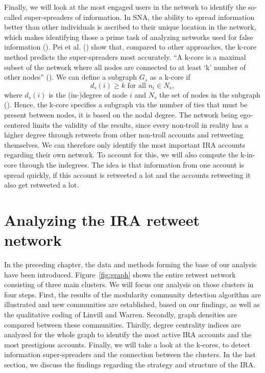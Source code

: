 \documentclass[12pt, titlepage=true, toc=bib]{scrartcl}
\begin{document}
Finally, we will look at the most engaged users in the network to identify the so-called super-spreaders of information. In SNA, the ability to spread information better than other individuals is ascribed to their unique location in the network, which makes identifying those a prime task of analyzing networks used for false information (\cite[1]{pei_searching_2015}). Pei et al. (\cite*{pei_searching_2015}) show that, compared to other approaches, the k-core method predicts the super-spreaders most accurately. \enquote{A k-core is a maximal subset of the network where all nodes are connected to at least \enquote{k} number of other nodes} (\cite[983]{golovchenko_state_2018}). We can define a subgraph \( G_{s} \) as a k-core if \[ d_{s}(i) \geq k \text{ for all } n_{i} \in N_{s} ,\] where \( d_{s}(i) \) is the (in-)degree of node \( i \) and \( N_{s} \) the set of nodes in the subgraph (\cite[266]{wasserman_social_1994}). Hence, the k-core specifies a subgraph via the number of ties that must be present between nodes, it is based on the nodal degree. The network being ego-centered limits the validity of the results, since every non-troll in reality has a higher degree through retweets from other non-troll accounts and retweeting themselves. We can therefore only identify the most important IRA accounts regarding their own network. To account for this, we will also compute the k-in-core through the indegrees. The idea is that information from one account is spread quickly, if this account is retweeted a lot and the accounts retweeting it also get retweeted a lot.


\section{Analyzing the IRA retweet network}

In the preceding chapter, the data and methods forming the base of our analysis have been introduced. Figure~\ref{fig:graph} shows the entire retweet network consisting of three main clusters. We will focus our analysis on those clusters in four steps. First, the results of the modularity community detection algorithm are illustrated and new communities are established, based on our findings, as well as the qualitative coding of Linvill and Warren. Secondly, graph densities are compared between these communities. Thirdly, degree centrality indices are analyzed for the whole graph to identify the most active IRA accounts and the most prestigious accounts. Finally, we will take a look at the k-cores, to detect information super-spreaders and the connection between the clusters. In the last section, we discuss the findings regarding the strategy and structure of the IRA.
\end{document}
